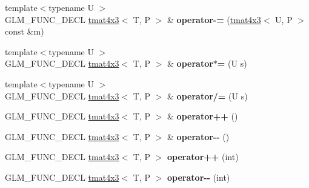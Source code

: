 \begin{DoxyCompactItemize}
\item 
{\footnotesize template$<$typename U $>$ }\\G\+L\+M\+\_\+\+F\+U\+N\+C\+\_\+\+D\+E\+CL \hyperlink{structglm_1_1detail_1_1tmat4x3}{tmat4x3}$<$ T, P $>$ \& {\bfseries operator-\/=} (\hyperlink{structglm_1_1detail_1_1tmat4x3}{tmat4x3}$<$ U, P $>$ const \&m)\hypertarget{structglm_1_1detail_1_1tmat4x3_ac22917356357c54fc3d560b53b7d882c}{}\label{structglm_1_1detail_1_1tmat4x3_ac22917356357c54fc3d560b53b7d882c}

\item 
{\footnotesize template$<$typename U $>$ }\\G\+L\+M\+\_\+\+F\+U\+N\+C\+\_\+\+D\+E\+CL \hyperlink{structglm_1_1detail_1_1tmat4x3}{tmat4x3}$<$ T, P $>$ \& {\bfseries operator$\ast$=} (U s)\hypertarget{structglm_1_1detail_1_1tmat4x3_aa0414419a047b76b18eb96110d207cf3}{}\label{structglm_1_1detail_1_1tmat4x3_aa0414419a047b76b18eb96110d207cf3}

\item 
{\footnotesize template$<$typename U $>$ }\\G\+L\+M\+\_\+\+F\+U\+N\+C\+\_\+\+D\+E\+CL \hyperlink{structglm_1_1detail_1_1tmat4x3}{tmat4x3}$<$ T, P $>$ \& {\bfseries operator/=} (U s)\hypertarget{structglm_1_1detail_1_1tmat4x3_a62e93a547d93d5f3d962d9af8e6ad9d7}{}\label{structglm_1_1detail_1_1tmat4x3_a62e93a547d93d5f3d962d9af8e6ad9d7}

\item 
G\+L\+M\+\_\+\+F\+U\+N\+C\+\_\+\+D\+E\+CL \hyperlink{structglm_1_1detail_1_1tmat4x3}{tmat4x3}$<$ T, P $>$ \& {\bfseries operator++} ()\hypertarget{structglm_1_1detail_1_1tmat4x3_aa43e9bf0fae76220a4acd8a37a7a2a6a}{}\label{structglm_1_1detail_1_1tmat4x3_aa43e9bf0fae76220a4acd8a37a7a2a6a}

\item 
G\+L\+M\+\_\+\+F\+U\+N\+C\+\_\+\+D\+E\+CL \hyperlink{structglm_1_1detail_1_1tmat4x3}{tmat4x3}$<$ T, P $>$ \& {\bfseries operator-\/-\/} ()\hypertarget{structglm_1_1detail_1_1tmat4x3_a9142d63a4f237f74fd5cc23a40f03453}{}\label{structglm_1_1detail_1_1tmat4x3_a9142d63a4f237f74fd5cc23a40f03453}

\item 
G\+L\+M\+\_\+\+F\+U\+N\+C\+\_\+\+D\+E\+CL \hyperlink{structglm_1_1detail_1_1tmat4x3}{tmat4x3}$<$ T, P $>$ {\bfseries operator++} (int)\hypertarget{structglm_1_1detail_1_1tmat4x3_a90dedf83f52b14d6b533aafd568f27d3}{}\label{structglm_1_1detail_1_1tmat4x3_a90dedf83f52b14d6b533aafd568f27d3}

\item 
G\+L\+M\+\_\+\+F\+U\+N\+C\+\_\+\+D\+E\+CL \hyperlink{structglm_1_1detail_1_1tmat4x3}{tmat4x3}$<$ T, P $>$ {\bfseries operator-\/-\/} (int)\hypertarget{structglm_1_1detail_1_1tmat4x3_ad1aa81d8abbe5ee270d0ad6b90b12899}{}\label{structglm_1_1detail_1_1tmat4x3_ad1aa81d8abbe5ee270d0ad6b90b12899}


\end{DoxyCompactItemize}

